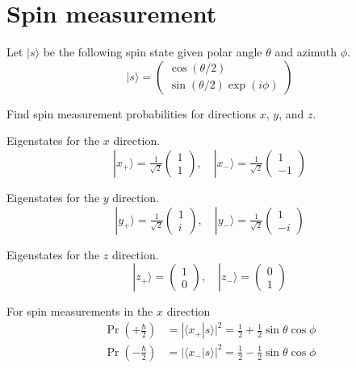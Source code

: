 

\section*{Spin measurement}

Let $|s\rangle$ be the following spin state given polar angle $\theta$ and azimuth $\phi$.
\begin{equation*}
|s\rangle=\begin{pmatrix}
\cos(\theta/2)
\\
\sin(\theta/2)\exp(i\phi)
\end{pmatrix}
\end{equation*}

Find spin measurement probabilities for directions $x$, $y$, and $z$.

\bigskip
Eigenstates for the $x$ direction.
\begin{equation*}
|x_+\rangle=\tfrac{1}{\sqrt2}\begin{pmatrix}1\\1\end{pmatrix},
\quad
|x_-\rangle=\tfrac{1}{\sqrt2}\begin{pmatrix}1\\-1\end{pmatrix}
\end{equation*}

Eigenstates for the $y$ direction.
\begin{equation*}
|y_+\rangle=\tfrac{1}{\sqrt2}\begin{pmatrix}1\\i\end{pmatrix},
\quad
|y_-\rangle=\tfrac{1}{\sqrt2}\begin{pmatrix}1\\-i\end{pmatrix}
\end{equation*}

Eigenstates for the $z$ direction.
\begin{equation*}
|z_+\rangle=\begin{pmatrix}1\\0\end{pmatrix},
\quad
|z_-\rangle=\begin{pmatrix}0\\1\end{pmatrix}
\end{equation*}

For spin measurements in the $x$ direction
\begin{align*}
\Pr\left(+\tfrac{\hbar}{2}\right)&=|\langle x_+|s\rangle|^2=\tfrac{1}{2}+\tfrac{1}{2}\sin\theta\cos\phi
\\
\Pr\left(-\tfrac{\hbar}{2}\right)&=|\langle x_-|s\rangle|^2=\tfrac{1}{2}-\tfrac{1}{2}\sin\theta\cos\phi
\end{align*}

